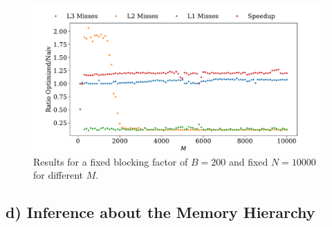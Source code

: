 \documentclass[a4paper, 11pt]{article}
\begin{document}
\begin{figure}
  \centering
  \includegraphics[width=\textwidth]{../plot/fixed_B_N_different_M.pdf}
  \caption{Results for a fixed blocking factor of $B=200$ and fixed $N=10000$
  for different $M$.}
  \label{fig:fixed_B_N_different_M}
\end{figure}

\subsection*{d) Inference about the Memory Hierarchy}
\end{document}
